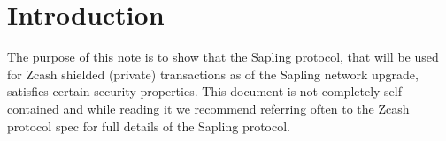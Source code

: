 \documentclass[11pt]{article}
\numberwithin{equation}{section} %
\numberwithin{figure}{section} %
\begin{document}
\newcommand{\key}{\ensuremath{\mathrm{sk}}\xspace}
\newcommand{\keyof}[1]{\ensuremath{\key(#1)}\xspace}
\newcommand{\keyset}{\ensuremath{{\mathcal K}}\xspace}


\newcommand{\adv}{\ensuremath{{\mathcal A}}\xspace}
\newcommand{\advprime}{\ensuremath{{\mathcal A'}}\xspace}
\newcommand{\advs}{\ensuremath{{\mathcal{A}}}\xspace}
\newcommand{\advaddrs}{\ensuremath{\addrs_{\adv}}\xspace}
\newcommand{\coinsofserialnums}[2]{\ensuremath{\coins(#1,#2)}\xspace}
\newcommand{\seq}{\ensuremath{\mathsf{r}}\xspace}
\newcommand{\querseq}{\ensuremath{\mathsf{q}}\xspace}
\newcommand{\sigquerseq}{\ensuremath{\mathsf{q^\sigma}}\xspace}
\newcommand{\schnorr}{\ensuremath{\mathsf{Schnorr}}\xspace}
\newcommand{\rawof}[1]{\ensuremath{\mathsf{raw(#1)}}\xspace}
\newcommand{\honest}{\ensuremath{\mathcal H}\xspace}
\newcommand{\ext}{\ensuremath{\mathcal \xi}\xspace}
\newcommand{\G}{\ensuremath{\mathbb{G}}\xspace}
\newcommand{\sigseq}{\ensuremath{\mathsf{\sigma}}\xspace}
\newcommand{\sk}{\ensuremath{\mathsf{sk}}\xspace}
\newcommand{\pk}{\ensuremath{\mathsf{pk}}\xspace}
\newcommand{\sigquer}{\ensuremath{\mathsf{q^\sigma}}\xspace}
\newcommand{\RO}{\ensuremath{\mathcal R}\xspace}
\newcommand{\ROsig}{\ensuremath{\mathcal R_{sig}}\xspace}
\newcommand{\sig}{\ensuremath{\sigma}\xspace}
\newcommand{\sign}{\ensuremath{\mathsf{sign}}\xspace}
\newcommand{\versig}{\ensuremath{\mathsf{verifySig}}\xspace}
\renewcommand{\sim}{\ensuremath{ {\mathcal S}}\xspace}
\newcommand{\simprv}{\ensuremath{\sim_{\mathsf{sign}}}\xspace}
\newcommand{\simro}{\ensuremath{\sim_{\RO}}\xspace}
\newcommand{\str}{\ensuremath{\mathrm{x}}\xspace}
\newcommand{\negl}{\ensuremath{\mathrm{negl}(\lambda)}\xspace}
\newcommand{\msg}{\ensuremath{\mathbf m}\xspace}
\newcommand{\dist}{\ensuremath{\mathrm{\pi}}\xspace}
\newcommand{\oracle}{\ensuremath{\mathscr O}\xspace}
\newcommand{\oracleprime}{\ensuremath{\mathscr O'}\xspace}
\newcommand{\g}{\ensuremath{\mathsf{g}}\xspace}

\section{Introduction}
The purpose of this note is to show that the Sapling protocol, that will be used for Zcash shielded (private) transactions as of the Sapling network upgrade, satisfies certain security properties. This document is not completely self contained and while reading it we recommend referring often to the Zcash protocol spec\cite{spec} for full details of the Sapling protocol.
\end{document}
